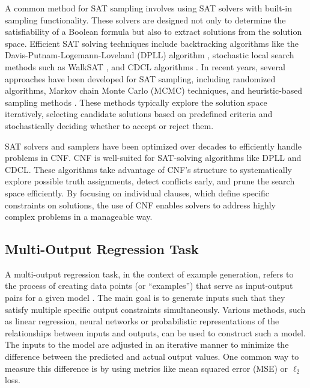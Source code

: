 A common method for SAT sampling involves using SAT solvers with built-in sampling functionality. These solvers are designed not only to determine the satisfiability of a Boolean formula but also to extract solutions from the solution space. Efficient SAT solving techniques include backtracking algorithms like the Davis-Putnam-Logemann-Loveland (DPLL) algorithm \cite{Davis1962DPLL}, stochastic local search methods such as WalkSAT \cite{selman1993local}, and CDCL algorithms \cite{Silva1996CDCL, silva2021CDCL}. In recent years, several approaches have been developed for SAT sampling, including randomized algorithms, Markov chain Monte Carlo (MCMC) techniques, and heuristic-based sampling methods \cite{Impagliazzo2017RandomSAT, kitchen2009markov, Soos2020unigen3, dutra2018quicksampler, Golia2021cmsgen}. These methods typically explore the solution space iteratively, selecting candidate solutions based on predefined criteria and stochastically deciding whether to accept or reject them.

SAT solvers and samplers have been optimized over decades to efficiently handle problems in CNF. CNF is well-suited for SAT-solving algorithms like DPLL and CDCL. These algorithms take advantage of CNF's structure to systematically explore possible truth assignments, detect conflicts early, and prune the search space efficiently. By focusing on individual clauses, which define specific constraints on solutions, the use of CNF enables solvers to address highly complex problems in a manageable way.





\subsection{Multi-Output Regression Task}
A multi-output regression task, in the context of example generation, refers to the process of creating data points (or ``examples'') that serve as input-output pairs for a given model \cite{Ardakani2024diffsampler}. The main goal is to generate inputs such that they satisfy multiple specific output constraints simultaneously. Various methods, such as linear regression, neural networks or probabilistic representations of the relationships between inputs and outputs, can be used to construct such a model. The inputs to the model are adjusted in an iterative manner to minimize the difference between the predicted and actual output values. One common way to measure this difference is by using metrics like mean squared error (MSE) or $\ell_2$ loss.

